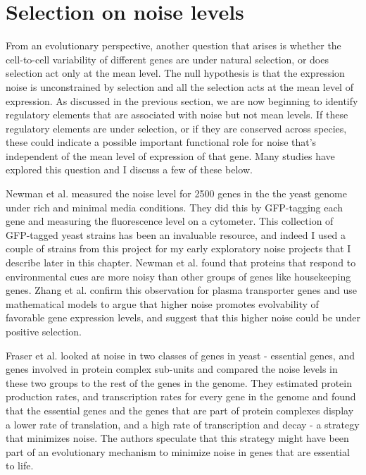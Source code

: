 \section{Selection on noise levels}

From an evolutionary perspective, another question that arises is whether the cell-to-cell variability of different genes are under natural selection, or does selection act only at the mean level. The null hypothesis is that the expression noise is unconstrained by selection and all the selection acts at the mean level of expression. As discussed in the previous section, we are now beginning to identify regulatory elements that are associated with noise but not mean levels. If these regulatory elements are under selection, or if they are conserved across species, these could indicate a possible important functional role for noise that's independent of the mean level of expression of that gene. Many studies have explored this question \cite{lehner2008msb} and I discuss a few of these below.

Newman et al. \cite{newman2006na} measured the noise level for 2500 genes in the the yeast genome under rich and minimal media conditions. They did this by GFP-tagging each gene and measuring the fluorescence level on a cytometer. This collection of GFP-tagged yeast strains has been an invaluable resource, and indeed I used a couple of strains from this project for my early exploratory noise projects that I describe later in this chapter. Newman et al. found that proteins that respond to environmental cues are more noisy than other groups of genes like housekeeping genes. Zhang et al. \cite{zhang2009msb} confirm this observation for plasma transporter genes and use mathematical models to argue that higher noise promotes evolvability of favorable gene expression levels, and suggest that this higher noise could be under positive selection. 

Fraser et al. \cite{fraser2004pb} looked at noise in two classes of genes in yeast - essential genes, and genes involved in protein complex sub-units and compared the noise levels in these two groups to the rest of the genes in the genome. They estimated protein production rates, and transcription rates for every gene in the genome and found that the essential genes and the genes that are part of protein complexes display a lower rate of translation, and a high rate of transcription and decay - a strategy that minimizes noise. The authors speculate that this strategy might have been part of an evolutionary mechanism to minimize noise in genes that are essential to life.

